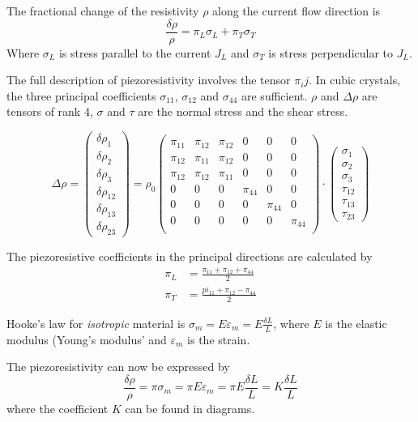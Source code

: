The fractional change of the resistivity $\rho$ along the current flow direction is
\begin{equation}
    \frac{\delta\rho}{\rho} = \pi_L \sigma_L + \pi_T \sigma_T
\end{equation}
Where $\sigma_L$ is stress parallel to the current $J_L$ and $\sigma_T$
is stress perpendicular to $J_L$.

The full description of piezoresistivity involves the tensor $\pi_ij$.
In cubic crystals, the three principal coefficients $\sigma_{11}$, $\sigma_{12}$
and $\sigma_{44}$ are sufficient.
$\rho$ and $\Delta\rho$ are tensors of rank 4, $\sigma$ and $\tau$ are the
normal stress and the shear stress.

\begin{equation}
    \Delta\rho = 
    \begin{pmatrix}
        \delta\rho_1\\ \delta\rho_2\\ \delta\rho_3\\ \delta\rho_{12}\\ \delta\rho_{13}\\ \delta\rho_{23}
    \end{pmatrix}
    = \rho_0
    \begin{pmatrix}
        \pi_{11} & \pi_{12} & \pi_{12} & 0 & 0 & 0 \\
        \pi_{12} & \pi_{11} & \pi_{12} & 0 & 0 & 0 \\
        \pi_{12} & \pi_{12} & \pi_{11} & 0 & 0 & 0 \\
        0 & 0 & 0 & \pi_{44} & 0 & 0 \\
        0 & 0 & 0 & 0 & \pi_{44} & 0 \\
        0 & 0 & 0 & 0 & 0 & \pi_{44} \\
    \end{pmatrix}
    \cdot
    \begin{pmatrix}
        \sigma_1 \\ \sigma_2 \\ \sigma_3 \\ \tau_{12} \\ \tau_{13} \\ \tau_{23}
    \end{pmatrix}
\end{equation}

The piezoresistive coefficients in the principal directions are calculated by
\begin{align}
    \pi_L &= \frac{\pi_{11} + \pi_{12} + \pi_{44}}{2} \\
    \pi_T &= \frac{pi_{11} + \pi_{12} - \pi_{44}}{2}
\end{align}

Hooke's law for \emph{isotropic} material is
$\sigma_m = E \varepsilon_m = E \frac{\delta L}{L}$,
where $E$ is the elastic modulus (Young's modulus' 
and $\varepsilon_m$ is the strain.

The piezoresistivity can now be expressed by
\begin{equation}
    \frac{\delta\rho}{\rho} = \pi\sigma_m = \pi E \varepsilon_m = \pi E \frac{\delta L}{L} = K \frac{\delta L}{L}
\end{equation}
where the coefficient $K$ can be found in diagrams.
